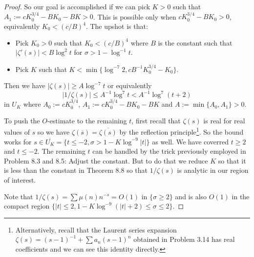 \documentclass[12pt]{article}
\newcommand{\cconj}[1]{\overline{#1}}
\begin{document}
\begin{proof}
So our goal is accomplished if we can pick $K > 0$ such that $A_1 := c K_0^{3/4} - B K_0 - B K > 0$. This is possible only when $c K_0^{3/4} - B K_0 > 0$, equivalently $K_0 < (c/B)^4$. The upshot is that:
\begin{itemize}
\item Pick $K_0 > 0$ such that $K_0 < (c/B)^4$ where $B$ is the constant such that $|\zeta'(s)| < B \log^2 t$ for $\sigma > 1 - \log^{-1} t$.
\item Pick $K$ such that $K < \min\{\log^{-7} 2, c B^{-1} K_0^{3/4} - K_0\}$.
\end{itemize}
Then we have $|\zeta(s)| \geq A \log^{-7} t$ or equivalently $$|1/\zeta(s)| \leq A^{-1} \log^7 t < A^{-1} \log^7 (t + 2)$$ 
in $U_K$ where $A_0 := cK_0^{3/4}$, $A_1 := c K_0^{3/4} - B K_0 - B K$ and $A := \min\{A_0, A_1\} > 0$.

To push the $O$-estimate to the remaining $t$, first recall that $\zeta(s)$ is real for real values of $s$ so we have $\zeta(\cconj{s}) = \cconj{\zeta(s)}$ by the reflection principle\footnote{Alternatively, recall that the Laurent series expansion $\zeta(s) = (s - 1)^{-1} + \sum a_n (s - 1)^n$ obtained in Problem 3.14 has real coefficients and we can see this identity directly.}. So the bound works for $s \in \cconj{U_K} = \{t \leq -2, \sigma > 1 - K \log^{-9} |t| \}$ as well. We have coverred $t \geq 2$ and $t \leq -2$. The remaining $t$ can be handled by the trick previously employed in Problem 8.3 and 8.5: Adjust the constant. But to do that we reduce $K$ so that it is less than the constant in Theorem 8.8 so that $1/\zeta(s)$ is analytic in our region of interest.

Note that $1/\zeta(s) = \sum \mu(n) n^{-s} = O(1)$ in $\{\sigma \geq 2\}$ and is also $O(1)$ in the compact region $\{|t| \leq 2, 1 - K\log^{-9}(|t| + 2) \leq \sigma \leq 2 \}$.
\end{proof}

\unless\ifdefined\IsMainDocument
\end{document}
